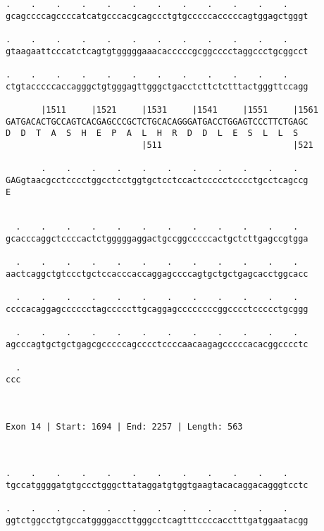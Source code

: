 \documentclass{article}
\begin{document}
\begin{Verbatim}
.    .    .    .    .    .    .    .    .    .    .    .    
gcagccccagccccatcatgcccacgcagccctgtgcccccacccccagtggagctgggt
                                                            
.    .    .    .    .    .    .    .    .    .    .    .    
gtaagaattcccatctcagtgtgggggaaacacccccgcggcccctaggccctgcggcct
                                                            
.    .    .    .    .    .    .    .    .    .    .    .    
ctgtacccccaccagggctgtgggagttgggctgacctcttctctttactgggttccagg
                                                            
       |1511     |1521     |1531     |1541     |1551     |1561
GATGACACTGCCAGTCACGAGCCCGCTCTGCACAGGGATGACCTGGAGTCCCTTCTGAGC
D  D  T  A  S  H  E  P  A  L  H  R  D  D  L  E  S  L  L  S  
                           |511                          |521
  
       .    .    .    .    .    .    .    .    .    .    .  
GAGgtaacgcctcccctggcctcctggtgctcctccactccccctcccctgcctcagccg
E                                                           
                                                            
  
  .    .    .    .    .    .    .    .    .    .    .    .  
gcacccaggctccccactctgggggaggactgccggcccccactgctcttgagccgtgga
                                                            
  .    .    .    .    .    .    .    .    .    .    .    .  
aactcaggctgtccctgctccacccaccaggagccccagtgctgctgagcacctggcacc
                                                            
  .    .    .    .    .    .    .    .    .    .    .    .  
ccccacaggagcccccctagcccccttgcaggagccccccccggcccctccccctgcggg
                                                            
  .    .    .    .    .    .    .    .    .    .    .    .  
agcccagtgctgctgagcgcccccagcccctccccaacaagagcccccacacggcccctc
                                                            
  .
ccc
   
   
 
Exon 14 | Start: 1694 | End: 2257 | Length: 563



.    .    .    .    .    .    .    .    .    .    .    .    
tgccatggggatgtgccctgggcttataggatgtggtgaagtacacaggacagggtcctc
                                                            
.    .    .    .    .    .    .    .    .    .    .    .    
ggtctggcctgtgccatggggaccttgggcctcagtttccccacctttgatggaatacgg
                                                            

\end{Verbatim}
\end{document}
